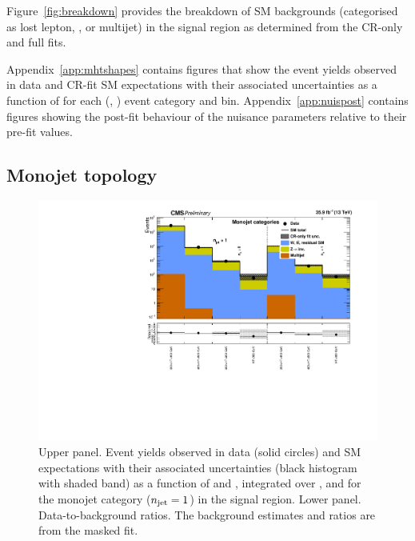 Figure~\ref{fig:breakdown} provides the breakdown of SM backgrounds
(categorised as lost lepton, \znunuj, or multijet) in the signal
region as determined from the CR-only and full fits.

Appendix~\ref{app:mhtshapes} contains figures that show the event
yields observed in data and CR-fit SM expectations with their
associated uncertainties as a function of \HTmiss for each (\njet,
\nb) event category and \scalht bin. Appendix~\ref{app:nuispost}
contains figures showing the post-fit behaviour of the nuisance
parameters relative to their pre-fit values.

\clearpage
\subsection{Monojet topology}

\begin{figure}[h!]
  \centering
  \caption{Upper panel. Event yields observed in data (solid circles)
    and SM expectations with their associated uncertainties (black
    histogram with shaded band) as a function of \nb and \scalht,
    integrated over \mht, and for the monojet category ($n_{\text{jet}} = 1$)
    in the signal region. Lower panel. Data-to-background ratios. The
    background estimates and ratios are from the masked fit. }
  \label{fig:mr_mono_pre}
  \includegraphics[width=1.\linewidth]{figures/results/36invfb_freeze/mono/summaryPlot_Monojet_prefit}
\end{figure}

